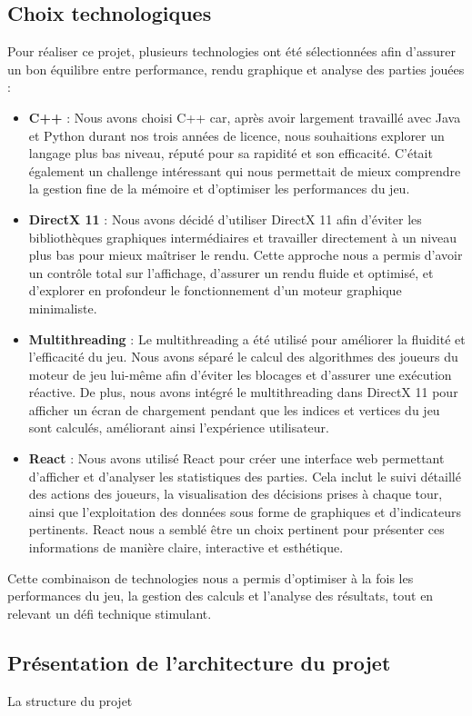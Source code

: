 \subsection{Choix technologiques}
Pour réaliser ce projet, plusieurs technologies ont été sélectionnées afin d’assurer un bon équilibre entre performance, rendu graphique et analyse des parties jouées :
\begin{itemize}
    \item \textbf{C++}  : Nous avons choisi C++ car, après avoir largement travaillé avec Java et Python durant nos trois années de licence, nous souhaitions explorer un langage plus bas niveau, réputé pour sa rapidité et son efficacité. C’était également un challenge intéressant qui nous permettait de mieux comprendre la gestion fine de la mémoire et d’optimiser les performances du jeu.
    \item \textbf{DirectX 11} : Nous avons décidé d’utiliser DirectX 11 afin d’éviter les bibliothèques graphiques intermédiaires et travailler directement à un niveau plus bas pour mieux maîtriser le rendu. Cette approche nous a permis d’avoir un contrôle total sur l’affichage, d’assurer un rendu fluide et optimisé, et d’explorer en profondeur le fonctionnement d’un moteur graphique minimaliste.
    \item \textbf{Multithreading} : Le multithreading a été utilisé pour améliorer la fluidité et l’efficacité du jeu. Nous avons séparé le calcul des algorithmes des joueurs du moteur de jeu lui-même afin d’éviter les blocages et d’assurer une exécution réactive. De plus, nous avons intégré le multithreading dans DirectX 11 pour afficher un écran de chargement pendant que les indices et vertices du jeu sont calculés, améliorant ainsi l’expérience utilisateur.
    \item \textbf{React} : Nous avons utilisé React pour créer une interface web permettant d’afficher et d’analyser les statistiques des parties. Cela inclut le suivi détaillé des actions des joueurs, la visualisation des décisions prises à chaque tour, ainsi que l’exploitation des données sous forme de graphiques et d’indicateurs pertinents. React nous a semblé être un choix pertinent pour présenter ces informations de manière claire, interactive et esthétique.
\end{itemize}
Cette combinaison de technologies nous a permis d’optimiser à la fois les performances du jeu, la gestion des calculs et l’analyse des résultats, tout en relevant un défi technique stimulant.

\subsection{Présentation de l'architecture du projet}
La structure du projet

